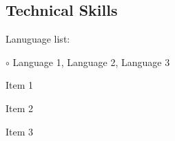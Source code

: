 \subsection*{Technical Skills}

\begin{itemize*}
  \item Lanuguage list: %
  \begin{itemize*}
    \vspace{-0.2em}
    \item[$\circ$] Language 1, Language 2, Language 3
    \vspace{-0.2em}
  \end{itemize*}
    \vspace{-0.2em}
  \item Item 1
  \item Item 2
  \item Item 3
\end{itemize*}


